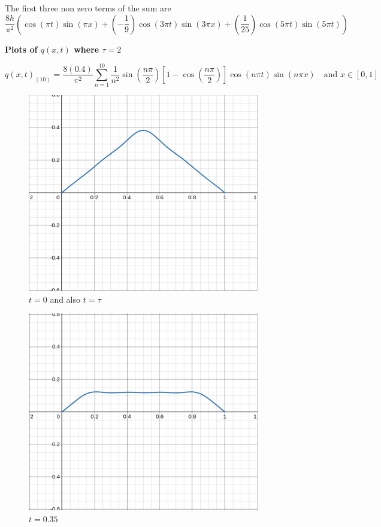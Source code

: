 \documentclass[letter, 10pts]{article}
\begin{document}
The first three non zero terms of the sum are 
\[
\frac{8h}{\pi ^2 }
\left(
\cos(\pi t) \sin(\pi x) 
+
\left(-\frac{1}{9}\right) \cos(3 \pi t) \sin (3 \pi x)
+ 
\left(\frac{1}{25}\right) \cos(5 \pi t) \sin(5 \pi t)
\right)
\] 

\newpage

\begin{center}
	{\huge \textbf{Plots of $q(x,t)$ where $\tau = 2$ }}
\end{center}
\[
\boxed{
q(x,t)_{(10)} = \frac{8 (0.4)}{\pi ^2 } 
\sum_{n=1}^{10} \frac{1}{n^2} \sin \left(\frac{n \pi }{2}\right) 
\left[ 
1 - \cos \left(\frac{n \pi }{2}\right)
\right] \cos \left( n \pi t\right) \sin (n \pi x) 
\quad \text{and } x \in [0,1]
}\]
\begin{minipage}{0.5\textwidth}
\begin{figure}[H]
	\centering
	\includegraphics[width=0.9\textwidth]{../phys311/ss/c_n_001.png}
	\caption{$t = 0$ and also $t = \tau$}
	\label{fig:ss-c_n_001-png}
\end{figure}
\begin{figure}[H]
	\centering
	\includegraphics[width=0.9\textwidth]{../phys311/ss/c_n_025.png}
	\caption{$t = 0.35$}
	\label{fig:ss-c_n_01-png}
\end{figure}
\end{minipage}
\end{document}
